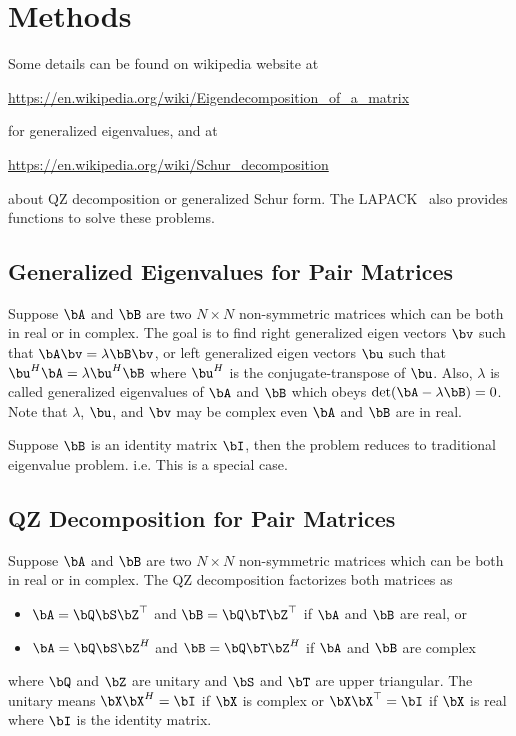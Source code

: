 
\section[Methods]{Methods}
\label{sec:methods}

Some details can be found on wikipedia website at
\begin{center}
\url{https://en.wikipedia.org/wiki/Eigendecomposition_of_a_matrix}
\end{center}
for generalized eigenvalues, and at
\begin{center}
\url{https://en.wikipedia.org/wiki/Schur_decomposition}
\end{center}
about QZ decomposition or generalized Schur form.
The LAPACK~\citep{laug} also provides functions to
solve these problems.


\subsection[Generalized Eigenvalues for Pair Matrices]{Generalized Eigenvalues for Pair Matrices}
\label{sec:generalized_eigenvalues_pair}

Suppose $\bA$ and $\bB$ are two $N\times N$ non-symmetric matrices
which can be both in real or in complex. The goal is to find right generalized
eigen vectors $\bv$ such that $\bA \bv = \lambda \bB \bv$, or left generalized
eigen vectors $\bu$ such
that $\bu^{H} \bA = \lambda \bu^{H} \bB$ where $\bu^{H}$ is the
conjugate-transpose of $\bu$.
Also, $\lambda$ is called generalized eigenvalues of $\bA$ and $\bB$
which obeys $\mbox{det}(\bA - \lambda\bB) = 0$.
Note that $\lambda$, $\bu$, and $\bv$ may be complex even $\bA$ and $\bB$
are in real.

Suppose $\bB$ is an identity matrix $\bI$, then the problem reduces to
traditional eigenvalue problem. i.e. This is a special case.


\subsection[QZ Decomposition for Pair Matrices]{QZ Decomposition for Pair Matrices}
\label{sec:qz_decomposition_pair}

Suppose $\bA$ and $\bB$ are two $N\times N$ non-symmetric matrices
which can be both in real or in complex.
The QZ decomposition factorizes both matrices as
\begin{itemize}
\item
$\bA = \bQ\bS\bZ^\top$ and $\bB = \bQ\bT\bZ^\top$
if $\bA$ and $\bB$ are real, or
\item
$\bA = \bQ\bS\bZ^{H}$ and $\bB = \bQ\bT\bZ^{H}$
if $\bA$ and $\bB$ are complex
\end{itemize}
where $\bQ$ and $\bZ$ are unitary and $\bS$ and $\bT$ are upper triangular.
The unitary means $\bX\bX^{H} = \bI$ if $\bX$ is complex or
$\bX\bX^\top = \bI$ if $\bX$ is real where $\bI$ is the identity matrix.

